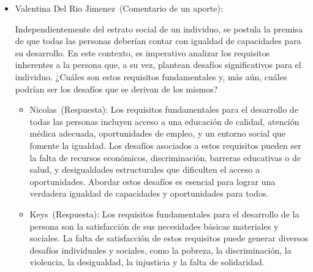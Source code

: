 \documentclass[letterpaper, 12pt]{article}
\newcommand{\liderValentina}{Valentina Del Rio Jimenez~}
\newcommand{\memberKeys}{Keys~}
\newcommand{\memberNicolas}{Nicolas~}
\begin{document}
\begin{itemize}[label=$\triangleright$]
          \begin{itemize}[label=$\diamond$]
              \item \liderValentina (Comentario de un aporte):

                    Independientemente del estrato social de un individuo, se
                    postula la premisa de que todas las personas deberían
                    contar con igualdad de capacidades para su desarrollo. En
                    este contexto, es imperativo analizar los requisitos
                    inherentes a la persona que, a su vez, plantean desafíos
                    significativos para el individuo. ¿Cuáles son estos
                    requisitos fundamentales y, más aún, cuáles podrían ser los
                    desafíos que se derivan de los mismos?

                    \begin{itemize}
                        \item \memberNicolas (Respuesta):
                              Los requisitos fundamentales para el desarrollo
                              de todas las personas incluyen acceso a una
                              educación de calidad, atención médica adecuada,
                              oportunidades de empleo, y un entorno social que
                              fomente la igualdad. Los desafíos asociados a
                              estos requisitos pueden ser la falta de recursos
                              económicos, discriminación, barreras educativas
                              o de salud, y desigualdades estructurales que
                              dificulten el acceso a oportunidades. Abordar
                              estos desafíos es esencial para lograr una
                              verdadera igualdad de capacidades y
                              oportunidades para todos.

                        \item \memberKeys (Respuesta):
                              Los requisitos fundamentales para el desarrollo
                              de la persona son la satisfacción de sus
                              necesidades básicas materiales y sociales.
                              La falta de satisfacción de estos requisitos
                              puede generar diversos desafíos individuales
                              y sociales, como la pobreza, la discriminación,
                              la violencia, la desigualdad, la injusticia y
                              la falta de solidaridad.
                    \end{itemize}
          \end{itemize}


\end{itemize}
\end{document}
